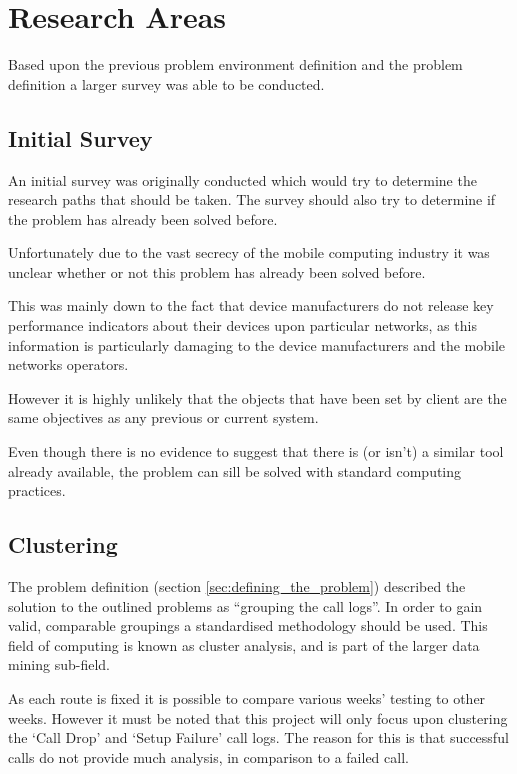 \section{Research Areas}

Based upon the previous problem environment definition and the problem 
definition a larger survey was able to be conducted.

\subsection{Initial Survey}
An initial survey was originally conducted which would try to determine the 
research paths that should be taken. The survey should also try to determine if
the problem has already been solved before.

Unfortunately due to the vast secrecy of the mobile computing industry it was
unclear whether or not this problem has already been solved before. 

This was mainly down to the fact that device manufacturers do not release key
performance indicators about their devices upon particular networks, as this 
information is particularly damaging to the device manufacturers and the mobile
networks operators.

However it is highly unlikely that the objects that have been set by client are
the same objectives as any previous or current system. 

Even though there is no evidence to suggest that there is (or isn't) a similar 
tool already available, the problem can sill be solved with standard computing 
practices.

\subsection{Clustering}
The problem definition (section \ref{sec:defining_the_problem}) described the 
solution to the outlined problems as ``grouping the call logs''. In order to 
gain valid, comparable groupings a standardised methodology should be used. 
This field of computing is known as cluster analysis, and is part of the larger 
data mining sub-field.

As each route is fixed it is possible to compare various weeks' testing to 
other weeks. However it must be noted that this project will only focus upon 
clustering the `Call Drop' and `Setup Failure' call logs. The reason for this 
is that successful calls do not provide much analysis, in comparison to a 
failed call.

